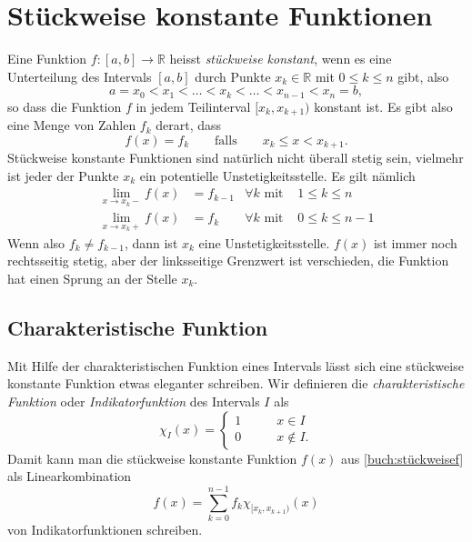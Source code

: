 %
%
%
\section{Stückweise konstante Funktionen%
\label{section:stueckweise}}
Eine Funktion $f\colon[a,b]\to\mathbb R$ heisst {\em stückweise konstant},
wenn es eine Unterteilung des Intervals $[a,b]$ durch Punkte
$x_k\in\mathbb R$ mit $0\le k\le n$ gibt, also
\[
a=x_0 < x_1 < \dots < x_k < \dots < x_{n-1} < x_n = b,
\]
so dass die Funktion $f$ in jedem Teilinterval $[x_k,x_{k+1})$
konstant ist.
Es gibt also eine Menge von Zahlen $f_k$ derart, dass
\begin{equation}
f(x)
=
f_k
\qquad\text{falls}\qquad
x_k \le x < x_{k+1}.
\label{buch:stückweisef}
\end{equation}
Stückweise konstante Funktionen sind natürlich nicht überall stetig sein,
vielmehr ist jeder der Punkte $x_k$ ein potentielle Unstetigkeitsstelle.
Es gilt nämlich
\begin{equation*}
\begin{aligned}
\lim_{x\to x_k-} f(x)
&=
f_{k-1}&\forall k\text{ mit }&1\le k \le n
\\
\lim_{x\to x_k+} f(x)
&=
f_k&\forall k\text{ mit }&0\le k \le n-1
\end{aligned}
\end{equation*}
Wenn also $f_k\ne f_{k-1}$, dann ist $x_k$ eine Unstetigkeitsstelle.
$f(x)$ ist immer noch rechtsseitig stetig, aber der linksseitige
Grenzwert ist verschieden, die Funktion hat einen Sprung an der
Stelle $x_k$.

\subsection{Charakteristische Funktion}
Mit Hilfe der charakteristischen Funktion eines Intervals lässt sich
eine stückweise konstante Funktion etwas eleganter schreiben.
Wir definieren  die {\em charakteristische Funktion} oder
{\em Indikatorfunktion} des Intervals $I$ als
\[
\chi_{I}(x) = \begin{cases}
1&\qquad x\in I\\
0&\qquad x\not\in I.
\end{cases}
\]
Damit kann man die stückweise konstante Funktion $f(x)$ aus
\eqref{buch:stückweisef}
als Linearkombination
\[
f(x)
=
\sum_{k=0}^{n-1} f_k\chi_{[x_k,x_{k+1})}(x)
\]
von Indikatorfunktionen schreiben.

